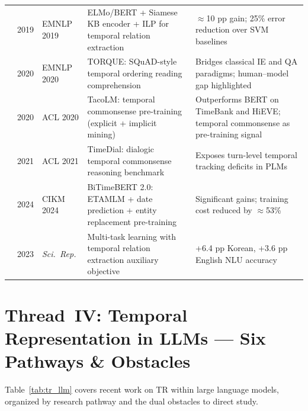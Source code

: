 \documentclass[12pt, a4paper]{article}
\begin{document}
\begin{longtable}{@{}p{3.8cm} p{1.0cm} p{2.6cm} p{4.5cm} p{3.2cm}@{}}
\textcite{ning2019improved}
  & 2019 & EMNLP 2019
  & ELMo/BERT + Siamese KB encoder + ILP for temporal relation extraction
  & $\approx$10 pp gain; 25\% error reduction over SVM baselines \\[4pt]

\textcite{torque2020}
  & 2020 & EMNLP 2020
  & TORQUE: SQuAD-style temporal ordering reading comprehension
  & Bridges classical IE and QA paradigms; human--model gap highlighted \\[4pt]

\textcite{tacolm2020}
  & 2020 & ACL 2020
  & TacoLM: temporal commonsense pre-training (explicit + implicit mining)
  & Outperforms BERT on TimeBank and HiEVE; temporal commonsense as pre-training signal \\[4pt]

\textcite{timedial2021}
  & 2021 & ACL 2021
  & TimeDial: dialogic temporal commonsense reasoning benchmark
  & Exposes turn-level temporal tracking deficits in PLMs \\[4pt]

\textcite{bitembert2024}
  & 2024 & CIKM 2024
  & BiTimeBERT 2.0: ETAMLM + date prediction + entity replacement pre-training
  & Significant gains; training cost reduced by $\approx$53\% \\[4pt]

\textcite{multitask2023}
  & 2023 & \emph{Sci.\ Rep.}
  & Multi-task learning with temporal relation extraction auxiliary objective
  & +6.4 pp Korean, +3.6 pp English NLU accuracy \\

\end{longtable}

\newpage

\section{Thread~IV: Temporal Representation in LLMs --- Six Pathways \& Obstacles}

Table~\ref{tab:tr_llm} covers recent work on TR within large language models, organized
by research pathway and the dual obstacles to direct study.
\end{document}
